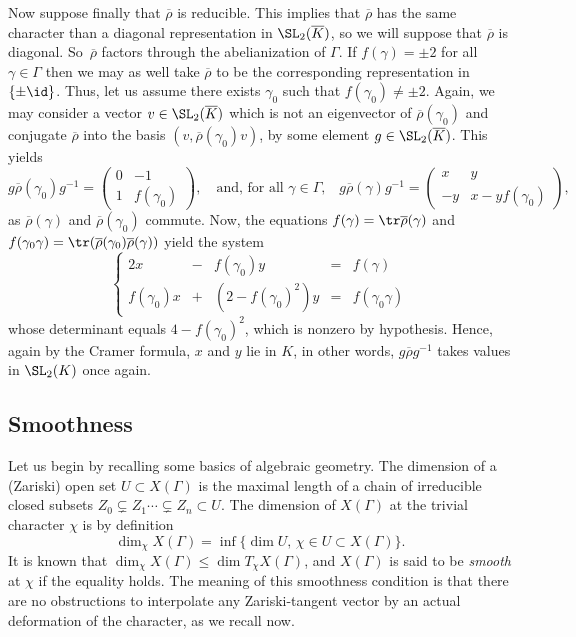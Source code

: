 Now suppose finally that $\overline{\rho}$ is reducible. This implies that
$\overline{\rho}$ has the same character than a diagonal representation in
$\SL_2(\overline{K})$, so we will suppose that $\overline{\rho}$ is diagonal.
So~$\overline{\rho}$ factors through the abelianization of $\Gamma$.
If $f(\gamma)=\pm 2$ for all $\gamma\in\Gamma$ then we may as well take
$\overline{\rho}$ to be the corresponding representation in
$\lbrace\pm \id\rbrace$. Thus, let us assume there exists $\gamma_0$ such
that $f(\gamma_0)\neq \pm 2$. Again, we may consider a vector
$v\in\SL_2(\overline{K})$ which is not an eigenvector of
$\overline{\rho}(\gamma_0)$ and conjugate $\overline{\rho}$ into the basis
$(v,\overline{\rho}(\gamma_0)v)$, by some element $g\in\SL_2(\overline{K})$.
This yields
\[
g\overline{\rho}(\gamma_0)g^{-1}=
\begin{pmatrix}0 & -1 \\ 1 & f(\gamma_0)\end{pmatrix},\quad\text{
and, for all $\gamma\in\Gamma$,}\quad
g\overline{\rho}(\gamma)g^{-1}=
\begin{pmatrix}x & y \\ -y & x-yf(\gamma_0)\end{pmatrix},
\]
as $\overline{\rho}(\gamma)$ and $\overline{\rho}(\gamma_0)$ commute.
Now, the equations $f(\gamma)=\tr \overline{\rho}(\gamma)$ and
$f(\gamma_0\gamma)=\tr(\overline{\rho}(\gamma_0)\overline{\rho}(\gamma))$
yield the system
\[ \left\lbrace\begin{array}{rcrcl}2x &-& f(\gamma_0)y &=& f(\gamma) \\
f(\gamma_0)x&+&(2-f(\gamma_0)^2)y &=& f(\gamma_0\gamma)\end{array}\right. \]
whose determinant equals $4-f(\gamma_0)^2$, which is nonzero by hypothesis.
Hence, again by the Cramer formula, $x$ and $y$ lie in $K$, in other
words, $g\overline{\rho} g^{-1}$ takes values in $\SL_2(K)$ once again.

\subsection{Smoothness}

Let us begin by recalling some basics of algebraic geometry.
The dimension of a (Zariski) open set $U\subset X(\Gamma)$ is the maximal
length of a chain of irreducible closed subsets
$Z_0\subsetneq Z_1\cdots \subsetneq Z_n \subset U$.
The dimension of $X(\Gamma)$ at the trivial character $\chi$ is by definition
\[ \dim_\chi X(\Gamma)=\inf \{\dim U,\, \chi\in U \subset X(\Gamma)\}. \]
It is known that $\dim_\chi X(\Gamma)\leq \dim T_\chi X(\Gamma)$, and
$X(\Gamma)$ is said to be {\em smooth} at $\chi$ if the equality holds.
The meaning of this smoothness condition is that there are no obstructions
to interpolate any Zariski-tangent vector by an actual deformation of the
character, as we recall now.

